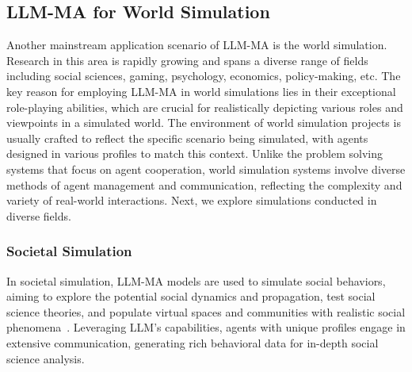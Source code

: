 \subsection{LLM-MA for World Simulation}

Another mainstream application scenario of LLM-MA is the world simulation.  Research in this area is rapidly growing and spans a diverse range of fields including social sciences, gaming, psychology, economics, policy-making, etc.
The key reason for employing LLM-MA in world simulations lies in their exceptional role-playing abilities, which are crucial for realistically depicting various roles and viewpoints in a simulated world.
The environment of world simulation projects is usually crafted to reflect the specific scenario being simulated, with agents designed in various profiles to match this context. Unlike the problem solving systems that focus on agent cooperation, world simulation systems involve diverse methods of agent management and communication, reflecting the complexity and variety of real-world interactions.
Next, we explore simulations conducted in diverse fields.



\subsubsection{Societal Simulation}
In societal simulation, LLM-MA models are used to simulate social behaviors, aiming to explore the potential social dynamics and propagation, test social science theories, and populate virtual spaces and communities with realistic social phenomena~\cite{park2023generative}.  Leveraging LLM's capabilities, agents with unique profiles engage in extensive communication, generating rich behavioral data for in-depth social science analysis. 

